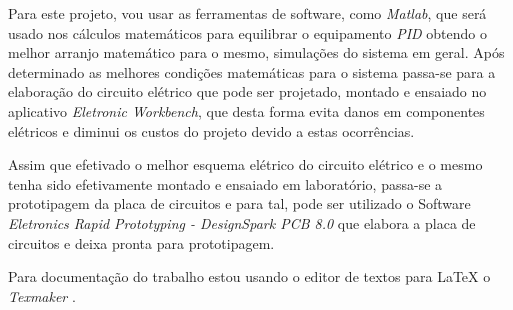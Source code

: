 \par Para este projeto, vou usar as ferramentas de software, como \emph{Matlab\tiny\textregistered}, que será usado nos cálculos matemáticos para equilibrar o equipamento \emph{PID} obtendo o melhor arranjo matemático para o mesmo, simulações do sistema em geral. Após determinado as melhores condições matemáticas para o sistema passa-se para a elaboração do circuito elétrico que pode ser projetado, montado e ensaiado no aplicativo \emph{Eletronic Workbench\tiny\textcopyright}, que desta forma evita danos em componentes elétricos e diminui os custos do projeto devido a estas ocorrências.

Assim que efetivado o melhor esquema elétrico do circuito elétrico e o mesmo tenha sido efetivamente montado e ensaiado em laboratório, passa-se a prototipagem da placa de circuitos e para tal, pode ser utilizado o Software \emph{Eletronics Rapid Prototyping - DesignSpark PCB 8.0\tiny\textcopyright} que elabora a placa de circuitos e deixa pronta para prototipagem.

Para documentação do trabalho estou usando o editor de textos para \LaTeX{} o \emph{Texmaker \tiny\textcopyright}.

